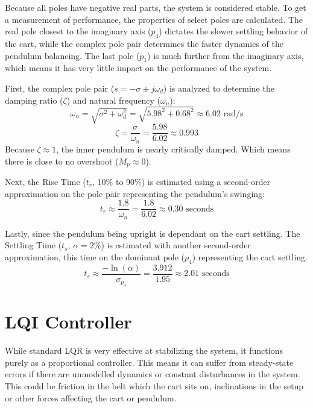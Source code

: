 Because all poles have negative real parts, the system is considered stable. To get a measurement of performance, the properties of select poles are calculated. The real pole closest to the imaginary axis ($p_4$) dictates the slower settling behavior of the cart, while the complex pole pair determines the faster dynamics of the pendulum balancing. The last pole ($p_1$) is much further from the imaginary axis, which means it has very little impact on the performance of the system.

First, the complex pole pair ($s = -\sigma \pm j\omega_d$)  is analyzed to determine the damping ratio ($\zeta$) and natural frequency ($\omega_n$):
\begin{equation}
	\omega_n = \sqrt{\sigma^2 + \omega_d^2} = \sqrt{5.98^2 + 0.68^2} \approx 6.02 \text{ rad/s}
\end{equation}
\begin{equation}
	\zeta = \frac{\sigma}{\omega_n} = \frac{5.98}{6.02} \approx 0.993
\end{equation}
Because $\zeta \approx 1$, the inner pendulum is nearly critically damped. Which means there is close to no overshoot ($M_p \approx 0$).

Next, the Rise Time ($t_r$, 10\% to 90\%) is estimated using a second-order approximation on the pole pair representing the pendulum's swinging:
\begin{equation}
	t_r \approx \frac{1.8}{\omega_n} = \frac{1.8}{6.02} \approx 0.30 \text{ seconds}
\end{equation}

Lastly, since the pendulum being upright is dependant on the cart settling. The Settling Time ($t_s$, $\alpha = 2\%$) is estimated with another second-order approximation, this time on the dominant pole ($p_4$) representing the cart settling. 
\begin{equation}
	t_s \approx \frac{-\ln(\alpha)}{\sigma_{p_4}} = \frac{3.912}{1.95} \approx 2.01 \text{ seconds}
\end{equation}

\section{LQI Controller}
While standard LQR is very effective at stabilizing the system, it functions purely as a proportional controller. This means it can suffer from steady-state errors if there are unmodelled dynamics or constant disturbances in the system. This could be friction in the belt which the cart sits on, inclinations in the setup or other forces affecting the cart or pendulum.

